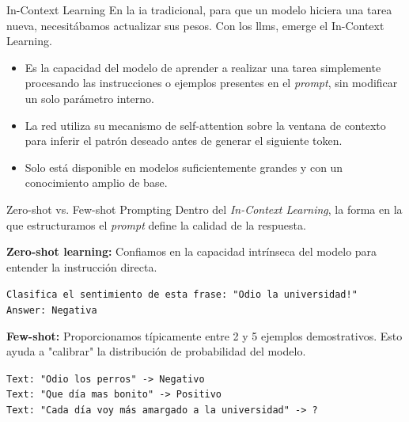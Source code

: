 \begin{frame}{In-Context Learning}
En la \gls{ia} tradicional, para que un modelo hiciera una \alert{tarea nueva}, necesitábamos \alert{actualizar sus pesos}. Con los \glspl{llm}, emerge el \alert{In-Context Learning}.

\begin{itemize}
    \item Es la capacidad del modelo de aprender a realizar una tarea simplemente procesando las instrucciones o ejemplos presentes en el \textit{prompt}, \alert{sin modificar un solo parámetro interno}.
    \item La red utiliza su mecanismo de \alert{self-attention} sobre la ventana de contexto para inferir el patrón deseado antes de generar el siguiente token.
    \item Solo está disponible en modelos suficientemente grandes y con un conocimiento amplio de base.
\end{itemize}
\end{frame}

\begin{frame}{Zero-shot vs. Few-shot Prompting}
Dentro del \textit{In-Context Learning}, la forma en la que estructuramos el \textit{prompt} define la calidad de la respuesta.

\textbf{\alert{Zero-shot learning:}} Confiamos en la capacidad intrínseca del modelo para entender la instrucción directa.
\begin{block}{}
\small
\texttt{Clasifica el sentimiento de esta frase: "Odio la universidad!"\\
Answer: Negativa}
\end{block}

\textbf{\alert{Few-shot:}} Proporcionamos típicamente entre 2 y 5 ejemplos demostrativos. Esto ayuda a "calibrar" la distribución de probabilidad del modelo.
\begin{block}{}
\small
\texttt{Text: "Odio los perros" -> Negativo\\
Text: "Que día mas bonito" -> Positivo\\
Text: "Cada día voy más amargado a la universidad" -> ?}
\end{block}
\end{frame}


